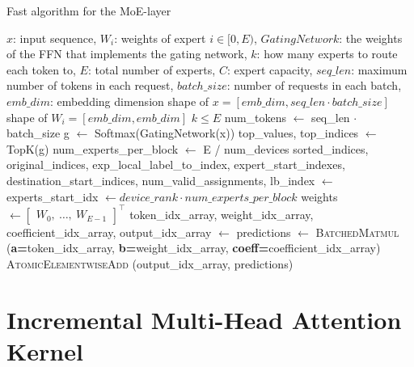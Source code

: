 \begin{algorithm}[H]
  \caption{Fast algorithm for the MoE-layer}
  \label{alg:parallel-moe}
  \small
  \begin{algorithmic}[1]
    \Ensure $x$: input sequence, $W_{i}$: weights of expert $i \in [0, E)$, $GatingNetwork$: the weights of the FFN that implements the gating network, $k$: how many experts to route each token to, $E$: total number of experts, $C$: expert capacity, $seq\_len$: maximum number of tokens in each request, $batch\_size$: number of requests in each batch, $emb\_dim$: embedding dimension
    \Require shape of $x = [emb\_dim, seq\_len \cdot batch\_size]$
    \Require shape of $W_{i} = [emb\_dim, emb\_dim]$
    \Require $k \leq E$
    \State num\_tokens $\leftarrow$ seq\_len $\cdot$ batch\_size
    \State g $\leftarrow$ Softmax(GatingNetwork(x))
    \State top\_values, top\_indices $\leftarrow$ TopK(g)
    \State num\_experts\_per\_block $\leftarrow$ E / num\_devices
    \State sorted\_indices, original\_indices, exp\_local\_label\_to\_index, expert\_start\_indexes, destination\_start\_indices, num\_valid\_assignments, lb\_index $\leftarrow$ 
    \State experts\_start\_idx $\leftarrow device\_rank \cdot num\_experts\_per\_block$
    \State weights $\leftarrow \begin{bmatrix} W_0, \ \dots, \ W_{E-1} \end{bmatrix}^\top$
    \State token\_idx\_array, weight\_idx\_array, coefficient\_idx\_array, output\_idx\_array $\leftarrow$ 
    \State predictions $\leftarrow$ \textsc{BatchedMatmul} (\textbf{a=}token\_idx\_array, \textbf{b=}weight\_idx\_array, \textbf{coeff=}coefficient\_idx\_array)
    \State \textsc{AtomicElementwiseAdd} (output\_idx\_array, predictions)

  \end{algorithmic}
\end{algorithm}


\section{Incremental Multi-Head Attention Kernel}

